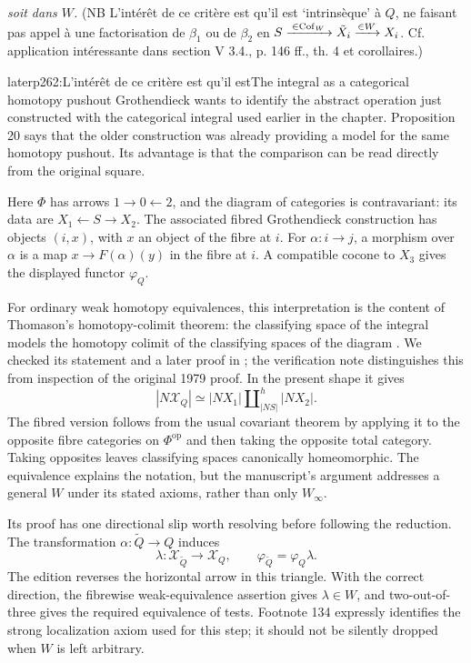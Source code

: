 \textit{soit dans $W$.} (NB L'intérêt de ce critère est qu'il est `intrinsèque' à $Q$, ne faisant pas appel à une factorisation de $\beta_1$ ou de $\beta_2$ en $S \xrightarrow{\;\in \mathrm{Cof}_W\;} \tilde{X}_i \xrightarrow{\in W} X_i$. Cf. application intéressante dans section V 3.4., p. 146 ff., th. 4 et corollaires.)

\begin{dcomment}{later}{p262:L'intérêt de ce critère est qu'il est}{The integral as a categorical homotopy pushout}
Grothendieck wants to identify the abstract operation just constructed with the categorical integral used earlier in the chapter. Proposition 20 says that the older construction was already providing a model for the same homotopy pushout. Its advantage is that the comparison can be read directly from the original square.

Here $\Phi$ has arrows $1\to0\leftarrow2$, and the diagram of categories is contravariant: its data are $X_1\leftarrow S\to X_2$. The associated fibred Grothendieck construction has objects $(i,x)$, with $x$ an object of the fibre at $i$. For $\alpha:i\to j$, a morphism over $\alpha$ is a map $x\to F(\alpha)(y)$ in the fibre at $i$. A compatible cocone to $X_3$ gives the displayed functor $\varphi_Q$.

For ordinary weak homotopy equivalences, this interpretation is the content of Thomason's homotopy-colimit theorem: the classifying space of the integral models the homotopy colimit of the classifying spaces of the diagram \citep[Theorem 1.2]{Thomason1979}. We checked its statement and a later proof in \citet[Theorem 26.8 and Corollary 26.9]{ChacholskiScherer2001}; the verification note distinguishes this from inspection of the original 1979 proof. In the present shape it gives
\[
 \left|N\mathcal X_Q\right|
 \simeq |NX_1|\amalg^{h}_{|NS|}|NX_2|.
\]
The fibred version follows from the usual covariant theorem by applying it to the opposite fibre categories on $\Phi^{\mathrm{op}}$ and then taking the opposite total category. Taking opposites leaves classifying spaces canonically homeomorphic. The equivalence explains the notation, but the manuscript's argument addresses a general $W$ under its stated axioms, rather than only $W_\infty$.

Its proof has one directional slip worth resolving before following the reduction. The transformation $\alpha:\tilde Q\to Q$ induces
\[
 \lambda:\mathcal X_{\tilde Q}\longrightarrow\mathcal X_Q,
 \qquad \varphi_{\tilde Q}=\varphi_Q\lambda.
\]
The edition reverses the horizontal arrow in this triangle. With the correct direction, the fibrewise weak-equivalence assertion gives $\lambda\in W$, and two-out-of-three gives the required equivalence of tests. Footnote 134 expressly identifies the strong localization axiom used for this step; it should not be silently dropped when $W$ is left arbitrary.


\end{dcomment}
